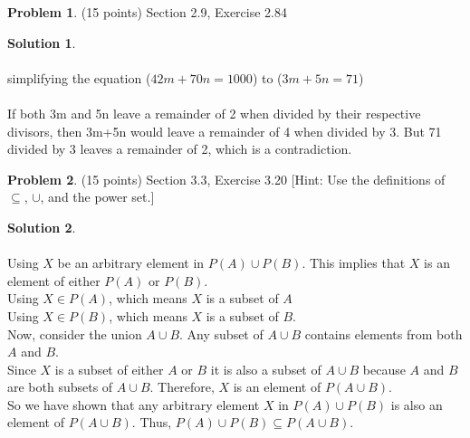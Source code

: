 \documentclass{article}
\theoremstyle{definition}
\newtheorem{problem}{Problem}
\newtheorem*{solution}{Solution}
\begin{document}
\newpage
\begin{problem} (15 points) Section 2.9, Exercise 2.84 
\end{problem}
\begin{solution} 
  ~\\
  \\simplifying the equation ($42m + 70n = 1000$) to ($3m + 5n = 71$)
  ~\\
  \\If both 3m and 5n leave a remainder of 2 when divided by their respective divisors, then 3m+5n would leave a remainder of 4 when divided by 3. But 71 divided by 3 leaves a remainder of 2, which is a contradiction.
\end{solution}

\newpage
\begin{problem} (15 points) Section 3.3, Exercise 3.20 
[Hint: Use the definitions of $\subseteq$, $\cup$, and the power set.]
\end{problem}
\begin{solution}
~\\
  \\Using $X$ be an arbitrary element in $P(A) \cup P(B)$. This implies that $X$ is an element of either $P(A)$ or $P(B)$. 
  \\Using $X \in P(A)$, which means $X$ is a subset of $A$
  \\Using $X \in P(B)$, which means $X$ is a subset of $B$.
  \\Now, consider the union $A \cup B$. Any subset of $A \cup B$ contains elements from both $A$ and $B$. 
  \\Since $X$ is a subset of either $A$ or $B$ it is also a subset of $A \cup B$ because $A$ and $B$ are both subsets of $A \cup B$. Therefore, $X$ is an element of $P(A \cup B)$.
  \\So we have shown that any arbitrary element $X$ in $P(A) \cup P(B)$ is also an element of $P(A \cup B)$. Thus, $P(A) \cup P(B) \subseteq P(A \cup B)$.
\end{solution}
\end{document}
